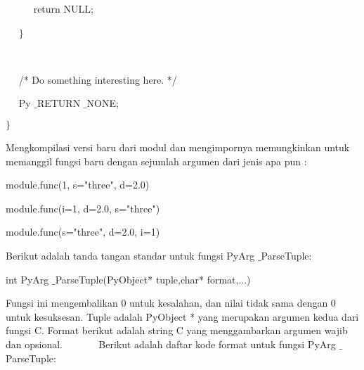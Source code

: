 \documentclass{wileySix}
\begin{document}
\begin{myEnumerate}
\begin{myEnumerate}
{\begin{myEnumerate}
\noindent 
~~~~~ return NULL; \par
\noindent 
~~  $  \}  $ \par
\noindent 
~~  \par
\noindent 
~~ /* Do something interesting here. */ \par
\noindent 
~~ Py $  \_  $RETURN $  \_  $NONE; \par
\noindent 
$  \}  $ \par
\vspace{12pt}
Mengkompilasi versi baru dari modul dan mengimpornya memungkinkan untuk memanggil fungsi baru dengan sejumlah argumen dari jenis apa pun : \par
\noindent 
module.func(1, s="three", d=2.0) \par
\noindent 
module.func(i=1, d=2.0, s="three") \par
\noindent 
module.func(s="three", d=2.0, i=1) \par
\vspace{12pt}
\vspace{12pt}
\vspace{12pt}
\vspace{12pt}
\noindent 
\hspace*{0.5in} Berikut adalah tanda tangan standar untuk fungsi PyArg $  \_  $ParseTuple: \par
\noindent 
int PyArg $  \_  $ParseTuple(PyObject* tuple,char* format,...) \par
\vspace{12pt}
\noindent 
\hspace*{0.5in} Fungsi ini mengembalikan 0 untuk kesalahan, dan nilai tidak sama dengan 0 untuk kesuksesan. Tuple adalah PyObject * yang merupakan argumen kedua dari fungsi C. Format berikut adalah string C yang menggambarkan argumen wajib dan opsional.\vspace{\baselineskip}
~~~~~~ Berikut adalah daftar kode format untuk fungsi PyArg $  \_  $ParseTuple: \par





\end{myEnumerate}}
\end{myEnumerate}
\end{myEnumerate}
\end{document}
